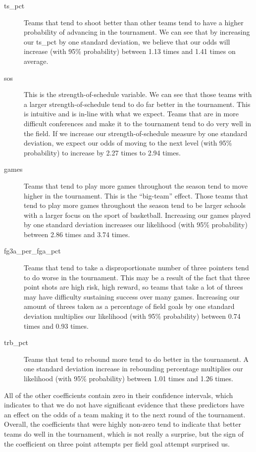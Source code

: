 \documentclass[10pt,a4paper, hidelinks]{article} %
\begin{document}
\begin{description}
	\item[ts\_pct] Teams that tend to shoot better than other teams tend to have a higher probability of advancing in the tournament. We can see that by increasing our ts\_pct by one standard deviation, we believe that our odds will increase (with 95\% probability) between 1.13 times and 1.41 times on average. 
	\item[sos] This is the strength-of-schedule variable. We can see that those teams with a larger strength-of-schedule tend to do far better in the tournament. This is intuitive and is in-line with what we expect. Teams that are in more difficult conferences and make it to the tournament tend to do very well in the field.  If we increase our strength-of-schedule measure by one standard deviation, we expect our odds of moving to the next level (with 95\% probability) to increase by 2.27 times to 2.94 times.
	\item[games] Teams that tend to play more games throughout the season tend to move higher in the tournament. This is the ``big-team'' effect. Those teams that tend to play more games throughout the season tend to be larger schools with a larger focus on the sport of basketball. Increasing our games played by one standard deviation increases our likelihood (with 95\% probability) between 2.86 times and 3.74 times. 
	\item[fg3a\_per\_fga\_pct] Teams that tend to take a disproportionate number of three pointers tend to do worse in the tournament. This may be a result of the fact that three point shots are high risk, high reward, so teams that take a lot of threes may have difficulty sustaining success over many games. Increasing our amount of threes taken as a percentage of field goals by one standard deviation multiplies our likelihood (with 95\% probability) between 0.74 times and 0.93 times. 
	\item[trb\_pct] Teams that tend to rebound more tend to do better in the tournament. A one standard deviation increase in rebounding percentage multiplies our likelihood (with 95\% probability) between 1.01 times and 1.26 times. 
\end{description}
All of the other coefficients contain zero in their confidence intervals, which indicates to that we do not have significant evidence that these predictors have an effect on the odds of a team making it to the next round of the tournament. Overall, the coefficients that were highly non-zero tend to indicate that better teams do well in the tournament, which is not really a surprise, but the sign of the coefficient on three point attempts per field goal attempt surprised us. 
\end{document}
